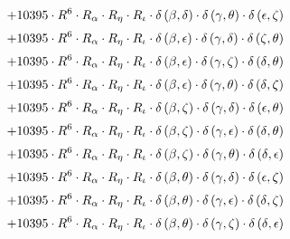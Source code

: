 \begin{subequations}
\begin{gather}
 \\[0.2em] \notag 		 + 10395 \cdot R^{6} \cdot R_{\alpha{}} \cdot R_{\eta{}} \cdot R_{\iota{}} \cdot \delta{}\left(\beta{}, \delta{}\right) \cdot \delta{}\left(\gamma{}, \theta{}\right) \cdot \delta{}\left(\epsilon{}, \zeta{}\right) 
 \\[0.2em] \notag 		 + 10395 \cdot R^{6} \cdot R_{\alpha{}} \cdot R_{\eta{}} \cdot R_{\iota{}} \cdot \delta{}\left(\beta{}, \epsilon{}\right) \cdot \delta{}\left(\gamma{}, \delta{}\right) \cdot \delta{}\left(\zeta{}, \theta{}\right) 
 \\[0.2em] \notag 		 + 10395 \cdot R^{6} \cdot R_{\alpha{}} \cdot R_{\eta{}} \cdot R_{\iota{}} \cdot \delta{}\left(\beta{}, \epsilon{}\right) \cdot \delta{}\left(\gamma{}, \zeta{}\right) \cdot \delta{}\left(\delta{}, \theta{}\right) 
 \\[0.2em] \notag 		 + 10395 \cdot R^{6} \cdot R_{\alpha{}} \cdot R_{\eta{}} \cdot R_{\iota{}} \cdot \delta{}\left(\beta{}, \epsilon{}\right) \cdot \delta{}\left(\gamma{}, \theta{}\right) \cdot \delta{}\left(\delta{}, \zeta{}\right) 
 \\[0.2em] \notag 		 + 10395 \cdot R^{6} \cdot R_{\alpha{}} \cdot R_{\eta{}} \cdot R_{\iota{}} \cdot \delta{}\left(\beta{}, \zeta{}\right) \cdot \delta{}\left(\gamma{}, \delta{}\right) \cdot \delta{}\left(\epsilon{}, \theta{}\right) 
 \\[0.2em] \notag 		 + 10395 \cdot R^{6} \cdot R_{\alpha{}} \cdot R_{\eta{}} \cdot R_{\iota{}} \cdot \delta{}\left(\beta{}, \zeta{}\right) \cdot \delta{}\left(\gamma{}, \epsilon{}\right) \cdot \delta{}\left(\delta{}, \theta{}\right) 
 \\[0.2em] \notag 		 + 10395 \cdot R^{6} \cdot R_{\alpha{}} \cdot R_{\eta{}} \cdot R_{\iota{}} \cdot \delta{}\left(\beta{}, \zeta{}\right) \cdot \delta{}\left(\gamma{}, \theta{}\right) \cdot \delta{}\left(\delta{}, \epsilon{}\right) 
 \\[0.2em] \notag 		 + 10395 \cdot R^{6} \cdot R_{\alpha{}} \cdot R_{\eta{}} \cdot R_{\iota{}} \cdot \delta{}\left(\beta{}, \theta{}\right) \cdot \delta{}\left(\gamma{}, \delta{}\right) \cdot \delta{}\left(\epsilon{}, \zeta{}\right) 
 \\[0.2em] \notag 		 + 10395 \cdot R^{6} \cdot R_{\alpha{}} \cdot R_{\eta{}} \cdot R_{\iota{}} \cdot \delta{}\left(\beta{}, \theta{}\right) \cdot \delta{}\left(\gamma{}, \epsilon{}\right) \cdot \delta{}\left(\delta{}, \zeta{}\right) 
 \\[0.2em] \notag 		 + 10395 \cdot R^{6} \cdot R_{\alpha{}} \cdot R_{\eta{}} \cdot R_{\iota{}} \cdot \delta{}\left(\beta{}, \theta{}\right) \cdot \delta{}\left(\gamma{}, \zeta{}\right) \cdot \delta{}\left(\delta{}, \epsilon{}\right) 

\end{gather}
\end{subequations}
